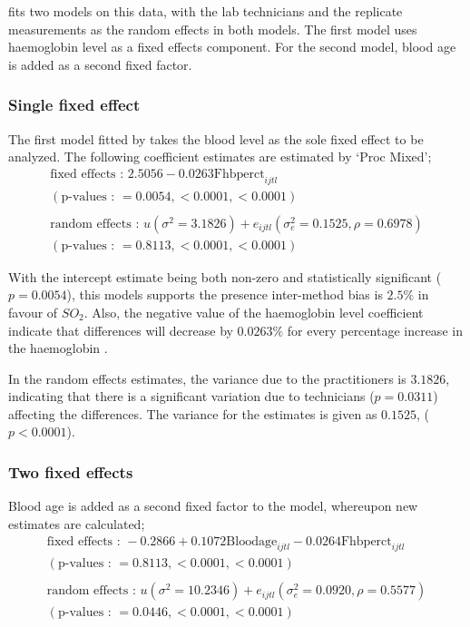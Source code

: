 \documentclass[12pt, a4paper]{report}
\theoremstyle{plain}
\theoremstyle{definition}
\theoremstyle{remark}
\begin{document}
\citet{LaiShiao} fits two models on this data, with the lab
technicians and the replicate measurements as the random effects
in both models. The first model uses haemoglobin level as a fixed
effects component. For the second model, blood age is added as a
second fixed factor.

\subsubsection{Single fixed effect} The first model fitted by \citet{LaiShiao} takes the
blood level as the sole fixed effect to be analyzed. The following
coefficient estimates are estimated by `Proc Mixed';
\begin{eqnarray}
\mbox{fixed effects :   } 2.5056 - 0.0263\mbox{Fhbperct}_{ijtl} \\
(\mbox{p-values :   } = 0.0054, <0.0001, <0.0001)\nonumber\\\nonumber\\
\mbox{random effects :   } u(\sigma^{2}=3.1826) + e_{ijtl}
(\sigma^{2}_{e}=0.1525, \rho= 0.6978) \nonumber\\
(\mbox{p-values :   } = 0.8113, <0.0001, <0.0001)\nonumber
\end{eqnarray}

With the intercept estimate being both non-zero and statistically
significant ($p=0.0054$), this models supports the presence
inter-method bias is $2.5\%$ in favour of $SO_{2}$. Also, the
negative value of the haemoglobin level coefficient indicate that
differences will decrease by $0.0263\%$ for every percentage
increase in the haemoglobin .

In the random effects estimates, the variance due to the
practitioners is $3.1826$, indicating that there is a significant
variation due to technicians ($p=0.0311$) affecting the
differences. The variance for the estimates is given as $0.1525$,
($p<0.0001$).

\subsubsection{Two fixed effects}
Blood age is added as a second fixed factor to the model,
whereupon new estimates are calculated;
\begin{eqnarray}
\mbox{fixed effects :   } -0.2866 + 0.1072 \mbox{Bloodage}_{ijtl}
- 0.0264\mbox{Fhbperct}_{ijtl}\nonumber\\
( \mbox{p-values :   } = 0.8113, <0.0001, <0.0001)\nonumber\\\nonumber\\
\mbox{random effects :   } u(\sigma^{2}=10.2346) + e_{ijtl}
(\sigma^{2}_{e}=0.0920, \rho= 0.5577) \nonumber\\
(\mbox{p-values :   } = 0.0446, <0.0001, <0.0001)
\end{eqnarray}
\end{document}
